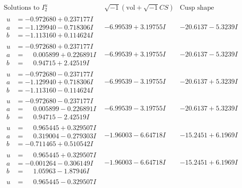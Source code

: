 \documentclass[1p]{elsarticle_modified}
\theoremstyle{definition}
\newcommand{\I}{\sqrt{-1}}
\begin{document}
$$\begin{array}{c|c|c}  
\text{Solutions to }I^u_{2}& \I (\text{vol} + \sqrt{-1}CS) & \text{Cusp shape}\\
 \hline 
\begin{aligned}
u &= -0.972680 + 0.237177 I \\
a &= -1.129940 - 0.718306 I \\
b &= -1.113160 + 0.114624 I\end{aligned}
 & -6.99539 + 3.19755 I & -20.6137 - 5.3239 I \\ \hline\begin{aligned}
u &= -0.972680 + 0.237177 I \\
a &= \phantom{-}0.005899 + 0.226891 I \\
b &= \phantom{-}0.94715 + 2.42519 I\end{aligned}
 & -6.99539 + 3.19755 I & -20.6137 - 5.3239 I \\ \hline\begin{aligned}
u &= -0.972680 - 0.237177 I \\
a &= -1.129940 + 0.718306 I \\
b &= -1.113160 - 0.114624 I\end{aligned}
 & -6.99539 - 3.19755 I & -20.6137 + 5.3239 I \\ \hline\begin{aligned}
u &= -0.972680 - 0.237177 I \\
a &= \phantom{-}0.005899 - 0.226891 I \\
b &= \phantom{-}0.94715 - 2.42519 I\end{aligned}
 & -6.99539 - 3.19755 I & -20.6137 + 5.3239 I \\ \hline\begin{aligned}
u &= \phantom{-}0.965445 + 0.329507 I \\
a &= \phantom{-}0.319004 - 0.279303 I \\
b &= -0.711465 + 0.510542 I\end{aligned}
 & -1.96003 - 6.64718 I & -15.2451 + 6.1969 I \\ \hline\begin{aligned}
u &= \phantom{-}0.965445 + 0.329507 I \\
a &= -0.001264 - 0.306149 I \\
b &= \phantom{-}1.05963 - 1.87946 I\end{aligned}
 & -1.96003 - 6.64718 I & -15.2451 + 6.1969 I \\ \hline\begin{aligned}
u &= \phantom{-}0.965445 - 0.329507 I \\

\end{aligned}
\end{array}$$
\end{document}
